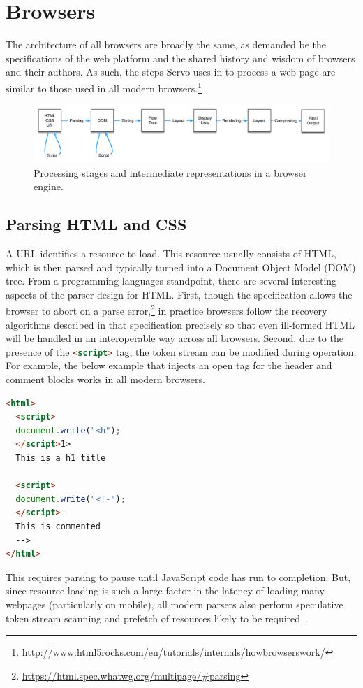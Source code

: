 
\section{Browsers}
\label{sec:browsers}

The architecture of all browsers are broadly the same, as demanded be the specifications of
the web platform and the shared history and wisdom of browsers and their authors.
As such, the steps Servo uses in  to process a web page
are similar to those used in all modern browsers.\footnote{\url{http://www.html5rocks.com/en/tutorials/internals/howbrowserswork/}}
\begin{figure}[ht]
  \begin{center}
    \includegraphics[scale=0.55]{pics/browser}
  \end{center}%
  \caption{Processing stages and intermediate representations in a browser engine.}
  \label{fig:browser}
\end{figure}%

\subsection{Parsing HTML and CSS}

A URL identifies a resource to load.
This resource usually consists of HTML, which is then parsed and typically turned into a Document Object
Model (DOM) tree.
From a programming languages standpoint, there are several interesting aspects of the parser design
for HTML.
First, though the specification allows the browser to abort on a parse error,\footnote{\url{https://html.spec.whatwg.org/multipage/#parsing}}
in practice browsers follow the recovery algorithms described in that specification precisely so that
even ill-formed HTML will be handled in an interoperable way across all browsers.
Second, due to the presence of the \lstinline[language=HTML]{<script>} tag, the token stream can be modified
during operation.
For example, the below example that injects an open tag for the header and comment blocks works in all modern browsers.
\begin{lstlisting}[language=HTML]
<html>
  <script>
  document.write("<h");
  </script>1>
  This is a h1 title

  <script>
  document.write("<!-");
  </script>-
  This is commented
  -->
</html>
\end{lstlisting}
This requires parsing to pause until JavaScript code has run to completion.
But, since resource loading is such a large factor in the latency of loading many webpages (particularly on mobile),
all modern parsers also perform speculative token stream scanning and prefetch of resources likely to be required~\cite{browsers-slow-smartphones}.


